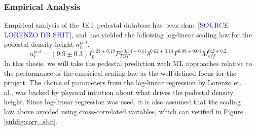 \documentclass[a4paper, twoside, final, 12pt]{article}
\begin{document}
\subsubsection{Empirical Analysis}

Empirical analysis of the JET pedestal database has been done [\textcolor{blue}{SOURCE LORENZO DB SHIT}], and has yielded the following log-linear scaling law for the pedestal density height $n_e^{ped}$.
\begin{equation} \label{eq:scaling}
	n_e^{ped} = (9.9 \pm 0.3) I_p^{1.24 \pm 0.19} P_{TOT}^{-0.34 \pm 0.11} \delta^{0.62 \pm 0.14} \Gamma^{ 0.08 \pm 0.04} M_{eff}^{0.2 \pm 0.2}
\end{equation}
In this thesis, we will take the pedestal prediction with ML approaches relative to the performance of the empirical scaling law as the well defined focus for the project.
The choice of parameters from the log-linear regression by Lorenzo et. al., was backed by physical intuition about what drives the pedestal density height. Since log-linear regression was used, it is also assumed that the scaling law above avoided using cross-correlated variables, which can verified in Figure \ref{subfig:corr_shit}. 
\end{document}
